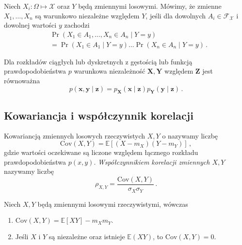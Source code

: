 \documentclass{myclass}
\numberwithin{equation}{subsection}
\begin{document}
\begin{definition}
Niech \(X_i : \Omega \mapsto \mathcal{X}\) oraz \(Y\) będą zmiennymi losowymi. Mówimy, że zmienne
\(X_1,\ldots,X_n\) są warunkowo niezależne względem \(Y\), jeśli dla dowolnych \(A_i \in
\mathcal{F}_\mathcal{X}\) i dowolnej wartości \(y\) zachodzi
\begin{equation*}
    \begin{split}
        &\Pr(X_1\in A_1,\ldots,X_n\in A_n \mid Y = y) \\
        &= \Pr(X_1 \in A_1 \mid Y = y)\ldots \Pr(X_n \in A_n \mid Y = y)\,.
    \end{split}
\end{equation*}  
\end{definition}

Dla rozkładów ciągłych lub dyskretnych z gęstością lub funkcją prawdopodobieństwa \(p\) warunkowa
niezależność \(\bm{X}, \bm{Y}\) względem \(\bm{Z}\) jest równoważna
\begin{equation*}
    p(\bm{x},\bm{y} \mid \bm{z}) = p_{\bm{X}}(\bm{x} \mid \bm{z})p_{\bm{Y}}(\bm{y} \mid \bm{z})\,.
\end{equation*}


\subsection{Kowariancja i współczynnik korelacji}

\begin{definition}[Kowariancji]
Kowariancją zmiennych losowych rzeczywistych \(X, Y\) o nazywamy liczbę
\begin{equation*}
    \mathrm{Cov}(X, Y) = \mathbb{E}[(X - m_X)(Y - m_Y)]\,,
\end{equation*}
gdzie wartości oczekiwane są liczone względem łącznego rozkładu prawdopodobieństwa \(p(x,y)\).
\emph{Współczynnikiem korelacji zmiennych \(X, Y\)} nazywamy liczbę
\begin{equation*}
    \rho_{X,Y} = \frac{\mathrm{Cov}(X, Y)}{\sigma_X \sigma_Y}\,.
\end{equation*}
\end{definition}

\begin{theorem}
Niech \(X, Y\) będą zmiennymi losowymi rzeczywistymi, wówczas

\begin{enumerate}

    \item \(\mathrm{Cov}(X, Y) = \mathbb{E}[XY] - m_X m_Y\).
    
    \item Jeśli \(X\) i \(Y\) są niezależne oraz istnieje \(\mathbb{E}(XY)\), to \(\mathrm{Cov}(X,Y)
    = 0\).
\end{enumerate}
\end{theorem}
\end{document}
